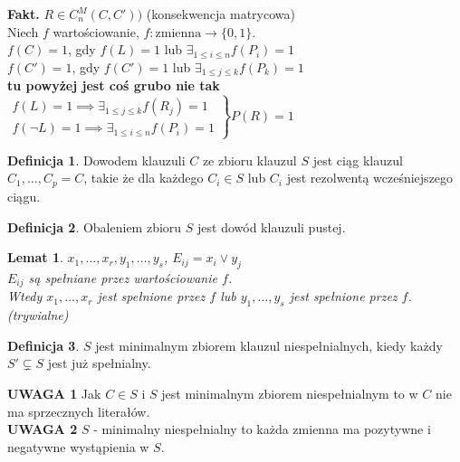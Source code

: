 \documentclass[10pt,a4paper]{article}
\theoremstyle{plain}
\newtheorem{lemma}{Lemat}
\theoremstyle{definition}
\newtheorem*{definition}{Definicja}
\newcommand{\header}[1]{\noindent\textbf{#1}}
\begin{document}
\header{Fakt.} $R \in C_n^M(C,C'))$ (konsekwencja matrycowa)\\
Niech $f$ wartościowanie, $f : \text{zmienna} \rightarrow \{0, 1\}$.\\
$f(C)=1$, gdy $f(L) = 1$ lub $\exists_{1\leq i \leq n} f(P_i) = 1$\\
$f(C')=1$, gdy $f(C') = 1$ lub $\exists_{1\leq j \leq k} f(P_k) = 1$\\
\textbf{tu powyżej jest coś grubo nie tak}\\
$\left.
\begin{array}{l}
f(L) = 1 \implies \exists_{1\leq j\leq k} f(R_j) = 1\\
f(\neg L) = 1 \implies \exists_{1\leq i\leq n} f(P_i) = 1
\end{array}
\right\} P(R) = 1$

\begin{definition}
Dowodem klauzuli $C$ ze zbioru klauzul $S$ jest ciąg klauzul $C_1, \ldots, C_p = C$, takie że dla każdego $C_i \in S$ lub $C_i$ jest rezolwentą wcześniejszego ciągu.
\end{definition}


\begin{definition}
Obaleniem zbioru $S$ jest dowód klauzuli pustej.
\end{definition}

\begin{lemma}
$x_1, \ldots, x_r, y_1, \ldots, y_s$, $E_{ij} = x_i \vee y_j$\\
$E_{ij}$ są spełniane przez wartościowanie $f$.\\
Wtedy $x_1, \ldots, x_r$ jest spełnione przez $f$ lub $y_1, \ldots, y_s$ jest spełnione przez $f$. (trywialne)
\end{lemma}


\begin{definition}
$S$ jest minimalnym zbiorem klauzul niespełnialnych, kiedy każdy $S' \subsetneq S$ jest już spełnialny.
\end{definition}

\header{UWAGA 1} Jak $C \in S$ i $S$ jest minimalnym zbiorem niespełnialnym to w $C$ nie ma sprzecznych literałów.\\
\header{UWAGA 2} $S$ - minimalny niespełnialny to każda zmienna ma pozytywne i negatywne wystąpienia w $S$.
\end{document}
